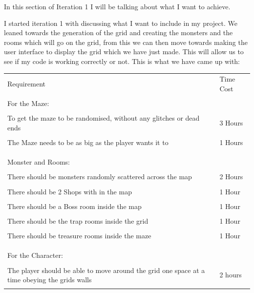 \documentclass[12pt]{article}
\begin{document}
In this section of Iteration 1 I will be talking about what I want to achieve.

I started iteration 1 with discussing what I want to include in my project. We leaned towards the generation of the grid and creating the monsters and the rooms which will go on the grid, from this we can then move towards making the user interface to display the grid which we have just made. This will allow us to see if my code is working correctly or not. This is what we have came up with:

\begin{tabularx}{\linewidth}{XX}
Requirement                                                                                    					         & Time Cost \\ \\
For the Maze: 																		  & 			  \\ \\
To get the maze to be randomised, without any glitches or dead ends                          		  & 3 Hours     \\ \\
The Maze needs to be as big as the player wants it to                                         			  & 1 Hours     \\ \\
																				  	  &			  \\ \\
Monster and Rooms:																  	  &			  \\ \\
There should be monsters randomly scattered across the map                                    	        & 2 Hours     \\ \\
There should be 2 Shops with in the map												  & 1 Hour   	  \\ \\
There should be a Boss room inside the map												  & 1 Hour	  \\ \\
There should be the trap rooms inside the grid											  & 1 Hour 	  \\ \\
There should be treasure rooms inside the maze											  & 1 Hour 	  \\ \\
																					  & 			  \\ \\
For the Character:																	  & 			  \\ \\
The player should be able to move around the grid one space at a time obeying the grids walls  & 2 hours  	  \\ \\
\end{tabularx}
\end{document}
